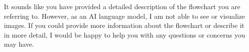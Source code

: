 It sounds like you have provided a detailed description of the flowchart you are referring to. However, as an AI language model, I am not able to see or visualize images. If you could provide more information about the flowchart or describe it in more detail, I would be happy to help you with any questions or concerns you may have.